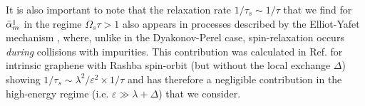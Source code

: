 It is also important to note that the relaxation rate $1/\tau_s\sim 1/\tau$ that we find for $\bar{\alpha}_m^{{\scriptscriptstyle\parallel}}$ in the regime $\Omega_s \tau > 1$ also appears in processes described by the Elliot-Yafet mechanism \cite{elliott_theory_1954, yafet_g_1963}, where, unlike in the Dyakonov-Perel case, spin-relaxation occurs \emph{during} collisions with impurities. This contribution was calculated in Ref. \cite{huertas-hernando_spin-orbit-mediated_2009} for intrinsic graphene with Rashba spin-orbit (but without the local exchange $\Delta$) showing $1/\tau_s \sim \lambda^2/\varepsilon^2 \times 1/\tau $ and has therefore a negligible contribution in the high-energy regime (i.e. $\varepsilon \gg \lambda + \Delta$) that we consider.




